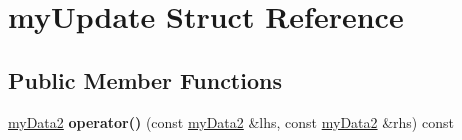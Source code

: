 \hypertarget{structmy_update}{}\section{my\+Update Struct Reference}
\label{structmy_update}
\subsection*{Public Member Functions}
\begin{DoxyCompactItemize}
\item 
\mbox{\label{structmy_update_a7f783aa2f3ae234dc399b2275c1d3eff}} 
\mbox{\hyperlink{structmy_data2}{my\+Data2}} {\bfseries operator()} (const \mbox{\hyperlink{structmy_data2}{my\+Data2}} \&lhs, const \mbox{\hyperlink{structmy_data2}{my\+Data2}} \&rhs) const
\end{DoxyCompactItemize}
